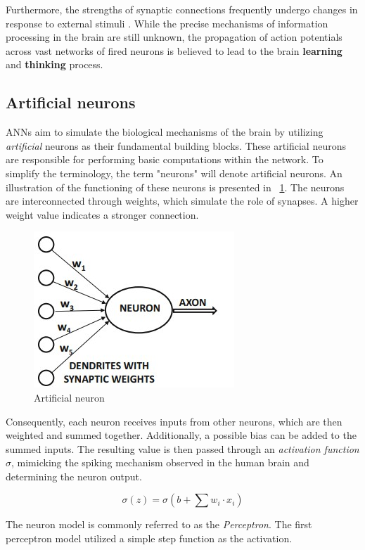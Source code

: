 Furthermore, the strengths of synaptic connections frequently undergo changes in response to external stimuli \cite{aggarwal2018neural}. While the precise mechanisms of information processing in the brain are still unknown, the propagation of action potentials across vast networks of fired neurons is believed to lead to the brain \textbf{learning} and \textbf{thinking} process.

\subsection{Artificial neurons}

ANNs aim to simulate the biological mechanisms of the brain by utilizing \textit{artificial} neurons as their fundamental building blocks. These artificial neurons are responsible for performing basic computations within the network. To simplify the terminology, the term "neurons" will denote artificial neurons.
An illustration of the functioning of these neurons is presented in \Fig~\ref{fig:art_neuron}. The neurons are interconnected through weights, which simulate the role of synapses. A higher weight value indicates a stronger connection.

\begin{figure}[h]
	\centering
	\includegraphics[width=0.4\linewidth]{ImageFiles/NeuralNetworks/art_neuron}
	\caption{Artificial neuron}
	\label{fig:art_neuron}
\end{figure}

Consequently, each neuron receives inputs from other neurons, which are then weighted and summed together. Additionally, a possible bias can be added to the summed inputs. The resulting value is then passed through an \textit{activation function} $\sigma$, mimicking the spiking mechanism observed in the human brain and determining the neuron output.

\[
	\sigma (z) = \sigma (b + \sum w_i \cdot x_i)
\]

The neuron model is commonly referred to as the \textit{Perceptron}. The first perceptron model utilized a simple step function as the activation.

